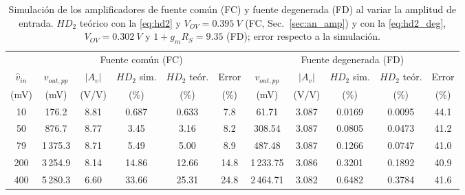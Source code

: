 \documentclass[conference]{IEEEtran}
\newcommand{\gm}{g_m}
\newcommand{\Vov}{V_{OV}}
\begin{document}
\begin{table}[htbp]
\centering
\caption{Simulación de los amplificadores de fuente común (FC) y fuente degenerada (FD) al variar la amplitud de entrada. $HD_2$ teórico con la \eqref{eq:hd2} y $\Vov=\SI{0.395}{V}$ (FC, Sec.~\ref{sec:an_amp}) y con la \eqref{eq:hd2_deg}, $\Vov=\SI{0.302}{V}$ y $1+\gm R_S=9.35$ (FD); error respecto a la simulación.}
\label{tab:sim}
\scriptsize
\renewcommand{\arraystretch}{1.03}
\setlength{\tabcolsep}{4pt}
\begin{tabular}{@{}c@{\hspace{12pt}}ccccc@{\hspace{12pt}}ccccc@{}}
\toprule
 & \multicolumn{5}{c}{Fuente común (FC)} & \multicolumn{5}{c}{Fuente degenerada (FD)} \\
\cmidrule(lr){2-6}\cmidrule(lr){7-11}
$\hat v_{in}$ & $v_{out,pp}$ & $|A_v|$ & $HD_2$ sim. & $HD_2$ teór. & Error & $v_{out,pp}$ & $|A_v|$ & $HD_2$ sim. & $HD_2$ teór. & Error \\
(mV) & (mV) & (V/V) & (\%) & (\%) & (\%) & (mV) & (V/V) & (\%) & (\%) & (\%) \\
\midrule
10 & 176.2 & 8.81 & 0.687 & 0.633 & 7.8 & 61.71 & 3.087 & 0.0169 & 0.0095 & 44.1 \\
50 & 876.7 & 8.77 & 3.45 & 3.16 & 8.2 & 308.54 & 3.087 & 0.0805 & 0.0473 & 41.2 \\
79 & 1\,375.3 & 8.71 & 5.49 & 5.00 & 8.9 & 487.48 & 3.087 & 0.1266 & 0.0747 & 41.0 \\
200 & 3\,254.9 & 8.14 & 14.86 & 12.66 & 14.8 & 1\,233.75 & 3.086 & 0.3201 & 0.1892 & 40.9 \\
400 & 5\,280.3 & 6.60 & 33.66 & 25.31 & 24.8 & 2\,464.71 & 3.082 & 0.6482 & 0.3784 & 41.6 \\
\bottomrule
\end{tabular}
\end{table}
\end{document}
